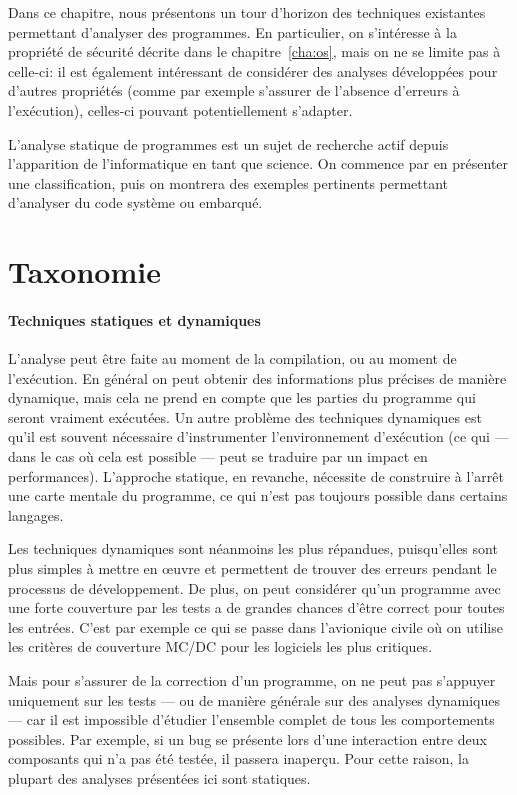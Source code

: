 Dans ce chapitre, nous présentons un tour d'horizon des techniques existantes
permettant d'analyser des programmes. En particulier, on s'intéresse à la
propriété de sécurité décrite dans le chapitre~\ref{cha:os}, mais on ne se
limite pas à celle-ci: il est également intéressant de considérer des analyses
développées pour d'autres propriétés (comme par exemple s'assurer de l'absence
d'erreurs à l'exécution), celles-ci pouvant potentiellement s'adapter.

L'analyse statique de programmes est un sujet de recherche actif depuis
l'apparition de l'informatique en tant que science. On commence par en présenter
une classification, puis on montrera des exemples pertinents permettant
d'analyser du code système ou embarqué.

\section{Taxonomie}

\paragraph{Techniques statiques et dynamiques}

L'analyse peut être faite au moment de la compilation, ou au moment de
l'exécution. En général on peut obtenir des informations plus précises de
manière dynamique, mais cela ne prend en compte que les parties du programme qui
seront vraiment exécutées. Un autre problème des techniques dynamiques est qu'il
est souvent nécessaire d'instrumenter l'environnement d'exécution (ce qui ---
dans le cas où cela est possible --- peut se traduire par un impact en
performances). L'approche statique, en revanche, nécessite de construire à
l'arrêt une carte mentale du programme, ce qui n'est pas toujours possible dans
certains langages.

Les techniques dynamiques sont néanmoins les plus répandues, puisqu'elles sont
plus simples à mettre en œuvre et permettent de trouver des erreurs pendant le
processus de développement. De plus, on peut considérer qu'un programme avec une
forte couverture par les tests a de grandes chances d'être correct pour toutes
les entrées. C'est par exemple ce qui se passe dans l'avionique civile où on
utilise les critères de couverture MC/DC pour les logiciels les plus critiques.

Mais pour s'assurer de la correction d'un programme, on ne peut pas s'appuyer
uniquement sur les tests --- ou de manière générale sur des analyses dynamiques
--- car il est impossible d'étudier l'ensemble complet de tous les comportements
possibles. Par exemple, si un bug se présente lors d'une interaction entre deux
composants qui n'a pas été testée, il passera inaperçu. Pour cette raison, la
plupart des analyses présentées ici sont statiques.


